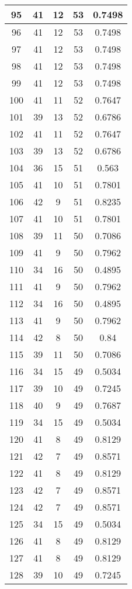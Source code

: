 \documentclass[letterpaper, 12pt]{article}
\begin{document}
\begin{longtable}{|c|c|c|c|c|}
\hline
95 & 41 & 12 & 53 & 0.7498 \\
\hline
96 & 41 & 12 & 53 & 0.7498 \\
\hline
97 & 41 & 12 & 53 & 0.7498 \\
\hline
98 & 41 & 12 & 53 & 0.7498 \\
\hline
99 & 41 & 12 & 53 & 0.7498 \\
\hline
100 & 41 & 11 & 52 & 0.7647 \\
\hline
101 & 39 & 13 & 52 & 0.6786 \\
\hline
102 & 41 & 11 & 52 & 0.7647 \\
\hline
103 & 39 & 13 & 52 & 0.6786 \\
\hline
104 & 36 & 15 & 51 & 0.563 \\
\hline
105 & 41 & 10 & 51 & 0.7801 \\
\hline
106 & 42 & 9 & 51 & 0.8235 \\
\hline
107 & 41 & 10 & 51 & 0.7801 \\
\hline
108 & 39 & 11 & 50 & 0.7086 \\
\hline
109 & 41 & 9 & 50 & 0.7962 \\
\hline
110 & 34 & 16 & 50 & 0.4895 \\
\hline
111 & 41 & 9 & 50 & 0.7962 \\
\hline
112 & 34 & 16 & 50 & 0.4895 \\
\hline
113 & 41 & 9 & 50 & 0.7962 \\
\hline
114 & 42 & 8 & 50 & 0.84 \\
\hline
115 & 39 & 11 & 50 & 0.7086 \\
\hline
116 & 34 & 15 & 49 & 0.5034 \\
\hline
117 & 39 & 10 & 49 & 0.7245 \\
\hline
118 & 40 & 9 & 49 & 0.7687 \\
\hline
119 & 34 & 15 & 49 & 0.5034 \\
\hline
120 & 41 & 8 & 49 & 0.8129 \\
\hline
121 & 42 & 7 & 49 & 0.8571 \\
\hline
122 & 41 & 8 & 49 & 0.8129 \\
\hline
123 & 42 & 7 & 49 & 0.8571 \\
\hline
124 & 42 & 7 & 49 & 0.8571 \\
\hline
125 & 34 & 15 & 49 & 0.5034 \\
\hline
126 & 41 & 8 & 49 & 0.8129 \\
\hline
127 & 41 & 8 & 49 & 0.8129 \\
\hline
128 & 39 & 10 & 49 & 0.7245 \\

\end{longtable}
\end{document}
